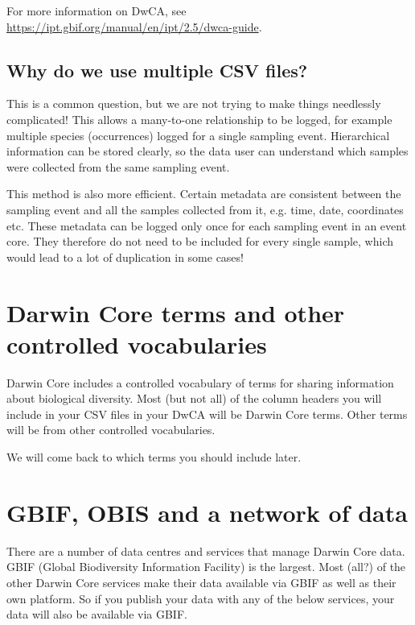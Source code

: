 \documentclass[a4paper,english, 11pt]{article}
\begin{document}
For more information on DwCA, see \url{https://ipt.gbif.org/manual/en/ipt/2.5/dwca-guide}.


\subsection{Why do we use multiple CSV files?}
\label{ss:multiplefiles}

This is a common question, but we are not trying to make things needlessly complicated! This allows a many-to-one relationship to be logged, for example multiple species (occurrences) logged for a single sampling event. Hierarchical information can be stored clearly, so the data user can understand which samples were collected from the same sampling event.

This method is also more efficient. Certain metadata are consistent between the sampling event and all the samples collected from it, e.g. time, date, coordinates etc. These metadata can be logged only once for each sampling event in an event core. They therefore do not need to be included for every single sample, which would lead to a lot of duplication in some cases!

\section{Darwin Core terms and other controlled vocabularies}
\label{s:dwcterms}

Darwin Core includes a controlled vocabulary of terms for sharing information about biological diversity. Most (but not all) of the column headers you will include in your CSV files in your DwCA will be Darwin Core terms. Other terms will be from other controlled vocabularies.

We will come back to which terms you should include later.

\section{GBIF, OBIS and a network of data}
\label{s:gbif}

There are a number of data centres and services that manage Darwin Core data. GBIF (Global Biodiversity Information Facility) is the largest. Most (all?) of the other Darwin Core services make their data available via GBIF as well as their own platform. So if you publish your data with any of the below services, your data will also be available via GBIF.
\end{document}
